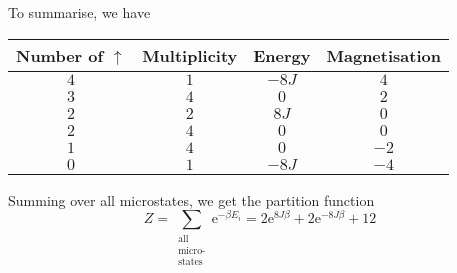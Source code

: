 \documentclass[12pt,english,a4paper]{article}
\renewcommand{\exp}[1]{\mathrm{e}^{#1}}
\begin{document}
    To summarise, we have
    \begin{table}[H]
        \centering
        \begin{tabular}{cccc}\toprule
            Number of \(\uparrow\) & Multiplicity & Energy & Magnetisation\\ \midrule
            \(4\) & \(1\) & \(-8J\) & \(4\) \\ \midrule
            \(3\) & \(4\) & \(0\) & \(2\) \\ \midrule
            \(2\) & \(2\) & \(8J\) & \(0\) \\ \midrule
            \(2\) & \(4\) & \(0\) & \(0\) \\ \midrule
            \(1\) & \(4\) & \(0\) & \(-2\) \\ \midrule
            \(0\) & \(1\) & \(-8J\) & \(-4\) \\ \bottomrule
        \end{tabular}
    \end{table}

    Summing over all microstates, we get the partition function
    \[
        Z = \sum_{\substack{\text{all}\\ \text{micro-}\\ \text{states}}} \exp{-\beta E_i}
        = 2\exp{8J\beta} + 2\exp{-8J\beta} + 12
    \]
\end{document}
